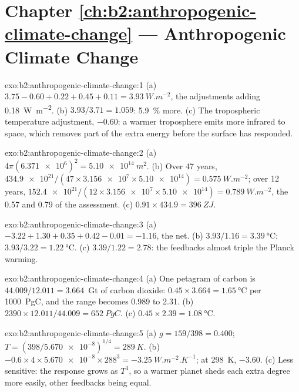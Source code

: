 \section*{Chapter \ref{ch:b2:anthropogenic-climate-change} --- Anthropogenic Climate Change}

\begin{solution}{exo:b2:anthropogenic-climate-change:1}
(a) $3.75 - 0.60 + 0.22 + 0.45 + 0.11 = \qty{3.93}{W.m^{-2}}$, the adjustments adding
\qty{0.18}{W.m^{-2}}. (b) $3.93/3.71 = 1.059$: \qty{5.9}{\percent} more. (c) The tropospheric
temperature adjustment, $-0.60$: a warmer troposphere emits more infrared to space, which removes
part of the extra energy before the surface has responded.
\end{solution}

\begin{solution}{exo:b2:anthropogenic-climate-change:2}
(a) $4\pi(\num{6.371e6})^2 = \qty{5.10e14}{m^2}$. (b) Over 47 years, $\num{434.9e21}/(47 \times
\num{3.156e7} \times \num{5.10e14}) = \qty{0.575}{W.m^{-2}}$; over 12 years, $\num{152.4e21}/(12
\times \num{3.156e7} \times \num{5.10e14}) = \qty{0.789}{W.m^{-2}}$, the 0.57 and 0.79 of the
assessment. (c) $0.91 \times 434.9 = \qty{396}{ZJ}$.
\end{solution}

\begin{solution}{exo:b2:anthropogenic-climate-change:3}
(a) $-3.22 + 1.30 + 0.35 + 0.42 - 0.01 = \num{-1.16}$, the net. (b) $3.93/1.16 =
\qty{3.39}{\celsius}$; $3.93/3.22 = \qty{1.22}{\celsius}$. (c) $3.39/1.22 = 2.78$: the feedbacks
almost triple the Planck warming.
\end{solution}

\begin{solution}{exo:b2:anthropogenic-climate-change:4}
(a) One petagram of carbon is $44.009/12.011 = 3.664$~Gt of carbon dioxide: $0.45 \times 3.664 =
\qty{1.65}{\celsius}$ per \qty{1000}{PgC}, and the range becomes 0.989 to 2.31. (b) $2390 \times
12.011/44.009 = \qty{652}{PgC}$. (c) $0.45 \times 2.39 = \qty{1.08}{\celsius}$.
\end{solution}

\begin{solution}{exo:b2:anthropogenic-climate-change:5}
(a) $g = 159/398 = 0.400$; $T = (398/\num{5.670e-8})^{1/4} = \qty{289}{K}$. (b) $-0.6 \times 4
\times \num{5.670e-8} \times 288^3 = \qty{-3.25}{W.m^{-2}.K^{-1}}$; at \qty{298}{K}, $-3.60$.
(c) Less sensitive: the response grows as $T^3$, so a warmer planet sheds each extra degree more
easily, other feedbacks being equal.
\end{solution}

